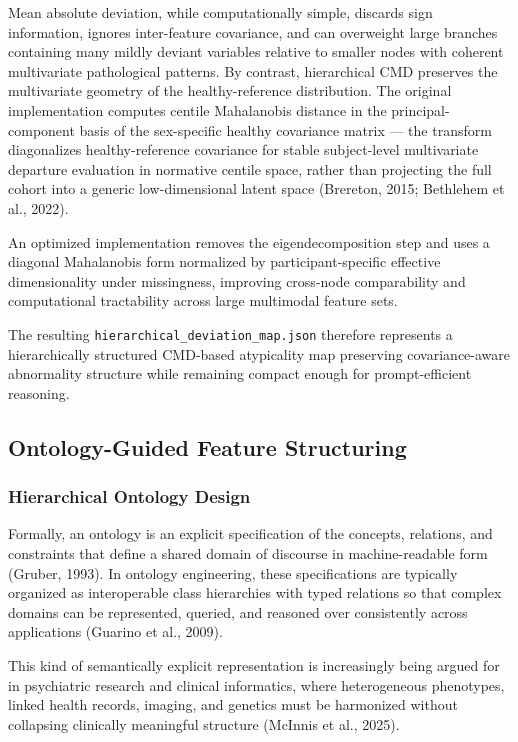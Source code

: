 \documentclass[11pt,a4paper,twoside]{article}
\begin{document}
Mean absolute deviation, while computationally simple, discards sign information, ignores inter-feature covariance, and can overweight large branches containing many mildly deviant variables relative to smaller nodes with coherent multivariate pathological patterns. By contrast, hierarchical CMD preserves the multivariate geometry of the healthy-reference distribution. The original implementation computes centile Mahalanobis distance in the principal-component basis of the sex-specific healthy covariance matrix --- the transform diagonalizes healthy-reference covariance for stable subject-level multivariate departure evaluation in normative centile space, rather than projecting the full cohort into a generic low-dimensional latent space (Brereton, 2015; Bethlehem et al., 2022).

An optimized implementation removes the eigendecomposition step and uses a diagonal Mahalanobis form normalized by participant-specific effective dimensionality under missingness, improving cross-node comparability and computational tractability across large multimodal feature sets.

The resulting \texttt{hierarchical\_{\allowbreak}deviation\_{\allowbreak}map.{\allowbreak}json} therefore represents a hierarchically structured CMD-based atypicality map preserving covariance-aware abnormality structure while remaining compact enough for prompt-efficient reasoning.

\subsection{Ontology-Guided Feature Structuring}
\subsubsection{Hierarchical Ontology Design}
Formally, an ontology is an explicit specification of the concepts, relations, and constraints that define a shared domain of discourse in machine-readable form (Gruber, 1993). In ontology engineering, these specifications are typically organized as interoperable class hierarchies with typed relations so that complex domains can be represented, queried, and reasoned over consistently across applications (Guarino et al., 2009).

This kind of semantically explicit representation is increasingly being argued for in psychiatric research and clinical informatics, where heterogeneous phenotypes, linked health records, imaging, and genetics must be harmonized without collapsing clinically meaningful structure (McInnis et al., 2025).
\end{document}
